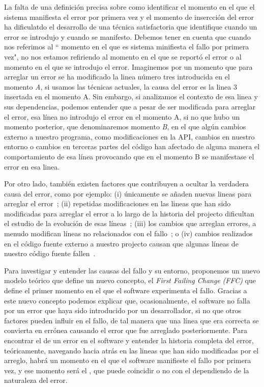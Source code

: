 \documentclass[a4paper, 12pt]{book}
\begin{document}
La falta de una definici\'on precisa sobre como identificar el momento en el que el sistema manifiesta el error por primera vez y el momento de insercci\'on del error ha dificulatdo el desarrollo de una t\'ecnica satisfactoria que identifique cuando un error se introdujo y cuando se manifesto. Debemos tener en cuenta que cuando nos referimos al `` momento en el que es sistema minifiesta el fallo por primera vez", no nos estamos refiriendo al momento en el que se report\'o el error o al momento en el que se introdujo el error. Imaginemos por un momento que para arreglar un error se ha modificado la linea n\'umero tres introducida en el momento \emph{A}, si usamos las t\'ecnicas actuales, la causa del error es la linea 3 insertada en el momento A. Sin embargo, si analizamos el contexto de esa linea y sus dependencias, podemos entender que a pesar de ser modificada para arreglar el error, esa l\'inea no introdujo el error en el momento A, si no que hubo un momento posterior, que denominaremos momento \emph{B}, en el que alg\'un cambios externo a nuestro programa, como modificaciones en la API, cambios en nuestro entorno o cambios en terceras partes del c\'odigo han afectado de alguna manera el comportamiento de  esa l\'inea provocando que en el momento B se manifestase el error en esa linea.

Por otro lado, tambi\'en existen factores que contribuyen a ocultar la verdadera causa del error, como por ejemplo: (i) \'unicamente se a\~naden nuevas lineas para arreglar el error~\cite{da2016framework}; (ii) repetidas modificaciones en las lineas que han sido modificadas para arreglar el error a lo largo de la historia del projecto dificultan el estudio de la evoluci\'on de esas l\'ineas~\cite{servant2017fuzzy}; (iii) los cambios que arreglan errores, a menudo modifican l\'ineas no relacionados con el fallo~\cite{herzig2013impact}; o (iv) cambios realizados en el  c\'odigo fuente externo a nuestro projecto causan que algunas l\'ineas de nuestro c\'odigo fuente fallen~\cite{german2009change}.

Para investigar y entender las causas del fallo y su entorno, proponemos un nuevo modelo te\'orico que define un nuevo concepto, el \emph{First Failing Change} \emph{(FFC)} que define el primer momento en el que el software experimenta el fallo. Gracias a este nuevo concepto podemos explicar que, ocasionalmente, el software no falla por un error que haya sido introducido por un desarrollador, si no que otros factores pueden influir en el fallo, de tal manera que una l\'inea que era correcta se convierta en err\'onea causando el error que fue arreglado posteriormente. Para encontrar el \FFC de un error en el software y entender la historia completa del error, te\'oricamente, navegando hacia atr\'as en las lineas que han sido modificadas por el arreglo, habr\'a un momento en el que el software manifieste el fallo por primera vez, y ese momento ser\'a el \FFC, que puede coincidir o no con el \BIC dependiendo de la naturaleza del error.
\end{document}
